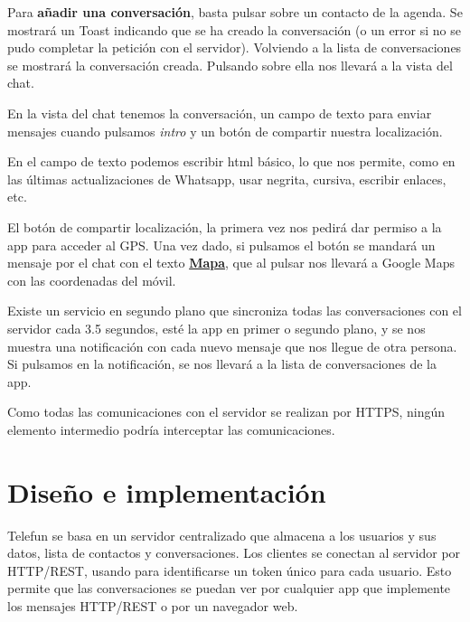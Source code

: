 \documentclass[]{article}
\begin{document}

\hfill

Para \textbf{añadir una conversación}, basta pulsar sobre un contacto de la agenda. Se mostrará un Toast indicando que se ha creado la conversación (o un error si no se pudo completar la petición con el servidor). Volviendo a la lista de conversaciones se mostrará la conversación creada. Pulsando sobre ella nos llevará a la vista del chat.

\hfill

En la vista del chat tenemos la conversación, un campo de texto para enviar mensajes cuando pulsamos \textit{intro} y un botón de compartir nuestra localización.


\hfill

En el campo de texto podemos escribir html básico, lo que nos permite, como en las últimas actualizaciones de Whatsapp, usar negrita, cursiva, escribir enlaces, etc.

El botón de compartir localización, la primera vez nos pedirá dar permiso a la app para acceder al GPS. Una vez dado, si pulsamos el botón se mandará un mensaje por el chat con el texto \textbf{\underline{Mapa}}, que al pulsar nos llevará a Google Maps con las coordenadas del móvil.

\hfill

Existe un servicio en segundo plano que sincroniza todas las conversaciones con el servidor cada 3.5 segundos, esté la app en primer o segundo plano, y se nos muestra una notificación con cada nuevo mensaje que nos llegue de otra persona. Si pulsamos en la notificación, se nos llevará a la lista de conversaciones de la app.


\hfill

Como todas las comunicaciones con el servidor se realizan por HTTPS, ningún elemento intermedio podría interceptar las comunicaciones.


\section{Diseño e implementación}


Telefun se basa en un servidor centralizado que almacena a los usuarios y sus datos, lista de contactos y conversaciones. Los clientes se conectan al servidor por HTTP/REST, usando para identificarse un token único para cada usuario. Esto permite que las conversaciones se puedan ver por cualquier app que implemente los mensajes HTTP/REST o por un navegador web.
\end{document}
